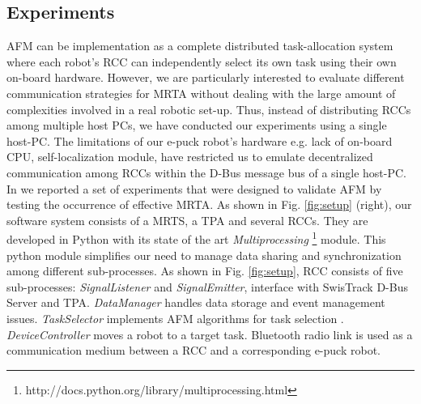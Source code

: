 \documentclass[draft]{ifacconf}
\begin{document}
\subsection{Experiments}
AFM can be implementation as a complete distributed task-allocation system where each robot's RCC can independently select its own task using their own on-board hardware. However, we are particularly interested to evaluate different communication strategies for MRTA without dealing with the large amount of complexities involved in a real robotic set-up. Thus, instead of distributing RCCs among multiple host PCs, we have conducted our experiments using a single host-PC. The limitations of our e-puck robot's hardware e.g. lack of on-board CPU, self-localization module, have restricted us to emulate decentralized communication among RCCs within the D-Bus message bus of a single host-PC. 
In \cite{Sarker+2010ants} we reported a set of experiments that were designed to validate AFM by testing the occurrence of effective MRTA.  As shown in Fig. \ref{fig:setup} (right), our software system consists of a MRTS, a TPA and several RCCs. They are developed in Python with its state of the art \textit{Multiprocessing} \footnote{http://docs.python.org/library/multiprocessing.html} module. This python module simplifies our need to manage data sharing and synchronization among different sub-processes. As shown in Fig. \ref{fig:setup}, RCC consists of five sub-processes: {\em SignalListener} and {\em SignalEmitter}, interface with SwisTrack D-Bus Server and TPA. {\em DataManager} handles data storage and event management issues. {\em TaskSelector} implements AFM algorithms for task selection . {\em DeviceController} moves a robot to a target task. Bluetooth radio link is used as a communication medium between a RCC and a corresponding e-puck robot.  
\end{document}
